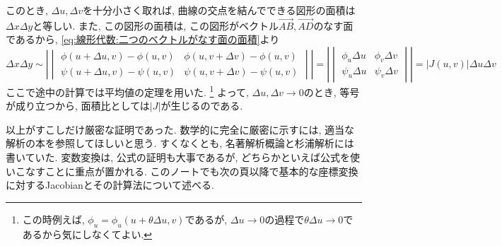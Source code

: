 \documentclass[a4j,dvipdfmx]{jsarticle}
\numberwithin{equation}{section}
\begin{document}
            このとき, $\Delta u,\Delta v$を十分小さく取れば, 曲線の交点を結んでできる図形の面積は$\Delta x\Delta y$と等しい.
            また, この図形の面積は, この図形がベクトル$\vec{AB},\vec{AD}$のなす面であるから, \eqref{eq:線形代数:二つのベクトルがなす面の面積}より
            \begin{equation*}
                \Delta x\Delta y\sim\left|\begin{vmatrix}\phi(u+\Delta u,v)-\phi(u,v) & \phi(u,v+\Delta v)-\phi(u,v) \\ \psi(u+\Delta u,v)-\psi(u,v) & \psi(u,v+\Delta v)-\psi(u,v)\end{vmatrix}\right|=\left|\begin{vmatrix}\phi_u\Delta u & \phi_v\Delta v \\ \psi_u\Delta u & \psi_v\Delta v\end{vmatrix}\right|=|J(u,v)|\Delta u\Delta v
            \end{equation*}
            ここで途中の計算では平均値の定理を用いた. \footnote{この時例えば, $\phi_u=\phi_u(u+\theta\Delta u,v)$であるが, $\Delta u\to 0$の過程で$\theta\Delta u\to 0$であるから気にしなくてよい.}
            よって, $\Delta u,\Delta v \to 0$のとき, 等号が成り立つから, 面積比としては$|J|$が生じるのである.

            以上がすこしだけ厳密な証明であった. 数学的に完全に厳密に示すには, 適当な解析の本を参照してほしいと思う. すくなくとも, 名著解析概論と杉浦解析には書いていた.
            変数変換は, 公式の証明も大事であるが, どちらかといえば公式を使いこなすことに重点が置かれる. このノートでも次の頁以降で基本的な座標変換に対するJacobianとその計算法について述べる.
\end{document}
